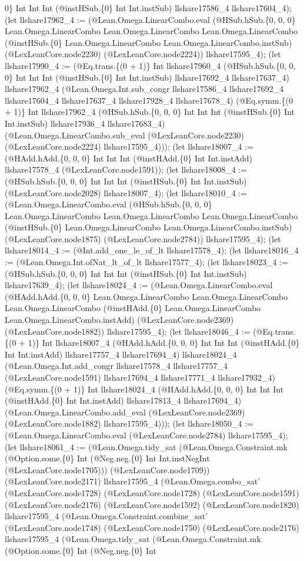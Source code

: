 \documentclass[11pt]{article}
\begin{document}
0\} Int Int Int (@instHSub.\{0\} Int Int.instSub) llshare17586\_4 llshare17604\_4); (let llshare17962\_4 := (@Lean.Omega.LinearCombo.eval (@HSub.hSub.\{0, 0, 0\} Lean.Omega.LinearCombo Lean.Omega.LinearCombo Lean.Omega.LinearCombo (@instHSub.\{0\} Lean.Omega.LinearCombo Lean.Omega.LinearCombo.instSub) (@LexLeanCore.node2230) (@LexLeanCore.node2224)) llshare17595\_4); (let llshare17990\_4 := (@Eq.trans.\{(0 + 1)\} Int llshare17960\_4 (@HSub.hSub.\{0, 0, 0\} Int Int Int (@instHSub.\{0\} Int Int.instSub) llshare17692\_4 llshare17637\_4) llshare17962\_4 (@Lean.Omega.Int.sub\_congr llshare17586\_4 llshare17692\_4 llshare17604\_4 llshare17637\_4 llshare17928\_4 llshare17678\_4) (@Eq.symm.\{(0 + 1)\} Int llshare17962\_4 (@HSub.hSub.\{0, 0, 0\} Int Int Int (@instHSub.\{0\} Int Int.instSub) llshare17936\_4 llshare17683\_4) (@Lean.Omega.LinearCombo.sub\_eval (@LexLeanCore.node2230) (@LexLeanCore.node2224) llshare17595\_4))); (let llshare18007\_4 := (@HAdd.hAdd.\{0, 0, 0\} Int Int Int (@instHAdd.\{0\} Int Int.instAdd) llshare17578\_4 (@LexLeanCore.node1591)); (let llshare18008\_4 := (@HSub.hSub.\{0, 0, 0\} Int Int Int (@instHSub.\{0\} Int Int.instSub) (@LexLeanCore.node2028) llshare18007\_4); (let llshare18010\_4 := (@Lean.Omega.LinearCombo.eval (@HSub.hSub.\{0, 0, 0\} Lean.Omega.LinearCombo Lean.Omega.LinearCombo Lean.Omega.LinearCombo (@instHSub.\{0\} Lean.Omega.LinearCombo Lean.Omega.LinearCombo.instSub) (@LexLeanCore.node1875) (@LexLeanCore.node2784)) llshare17595\_4); (let llshare18014\_4 := (@Int.add\_one\_le\_of\_lt llshare17578\_4); (let llshare18016\_4 := (@Lean.Omega.Int.ofNat\_lt\_of\_lt llshare17577\_4); (let llshare18023\_4 := (@HSub.hSub.\{0, 0, 0\} Int Int Int (@instHSub.\{0\} Int Int.instSub) llshare17639\_4); (let llshare18024\_4 := (@Lean.Omega.LinearCombo.eval (@HAdd.hAdd.\{0, 0, 0\} Lean.Omega.LinearCombo Lean.Omega.LinearCombo Lean.Omega.LinearCombo (@instHAdd.\{0\} Lean.Omega.LinearCombo Lean.Omega.LinearCombo.instAdd) (@LexLeanCore.node2369) (@LexLeanCore.node1882)) llshare17595\_4); (let llshare18046\_4 := (@Eq.trans.\{(0 + 1)\} Int llshare18007\_4 (@HAdd.hAdd.\{0, 0, 0\} Int Int Int (@instHAdd.\{0\} Int Int.instAdd) llshare17757\_4 llshare17694\_4) llshare18024\_4 (@Lean.Omega.Int.add\_congr llshare17578\_4 llshare17757\_4 (@LexLeanCore.node1591) llshare17694\_4 llshare17771\_4 llshare17932\_4) (@Eq.symm.\{(0 + 1)\} Int llshare18024\_4 (@HAdd.hAdd.\{0, 0, 0\} Int Int Int (@instHAdd.\{0\} Int Int.instAdd) llshare17813\_4 llshare17694\_4) (@Lean.Omega.LinearCombo.add\_eval (@LexLeanCore.node2369) (@LexLeanCore.node1882) llshare17595\_4))); (let llshare18050\_4 := (@Lean.Omega.LinearCombo.eval (@LexLeanCore.node2784) llshare17595\_4); (let llshare18061\_4 := (@Lean.Omega.tidy\_sat (@Lean.Omega.Constraint.mk (@Option.some.\{0\} Int (@Neg.neg.\{0\} Int Int.instNegInt (@LexLeanCore.node1705))) (@LexLeanCore.node1709)) (@LexLeanCore.node2171) llshare17595\_4 (@Lean.Omega.combo\_sat' (@LexLeanCore.node1728) (@LexLeanCore.node1728) (@LexLeanCore.node1591) (@LexLeanCore.node2176) (@LexLeanCore.node1592) (@LexLeanCore.node1820) llshare17595\_4 (@Lean.Omega.Constraint.combine\_sat' (@LexLeanCore.node1748) (@LexLeanCore.node1750) (@LexLeanCore.node2176) llshare17595\_4 (@Lean.Omega.tidy\_sat (@Lean.Omega.Constraint.mk (@Option.some.\{0\} Int (@Neg.neg.\{0\} Int 
\end{document}
